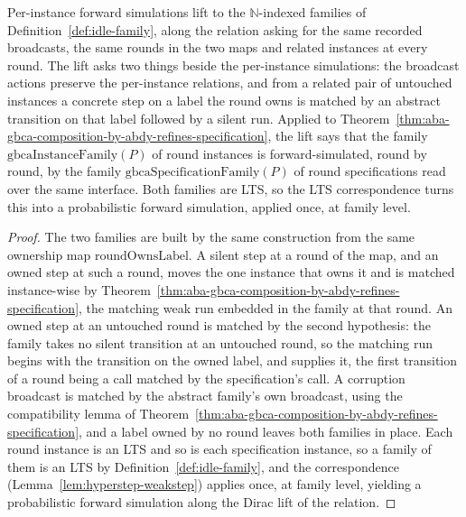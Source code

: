 \begin{theorem}
  \label{thm:gbca-family-refines}
  \leanok
  Per-instance forward simulations lift to the $\mathbb{N}$-indexed families of Definition~\ref{def:idle-family}, along the relation asking for the same recorded broadcasts, the same rounds in the two maps and related instances at every round.
  The lift asks two things beside the per-instance simulations: the broadcast actions preserve the per-instance relations, and from a related pair of untouched instances a concrete step on a label the round owns is matched by an abstract transition on that label followed by a silent run.
  Applied to Theorem~\ref{thm:aba-gbca-composition-by-abdy-refines-specification}, the lift says that the family $\mathrm{gbcaInstanceFamily}(P)$ of round instances is forward-simulated, round by round, by the family $\mathrm{gbcaSpecificationFamily}(P)$ of round specifications read over the same interface.
  Both families are LTS, so the LTS correspondence turns this into a probabilistic forward simulation, applied once, at family level.
\end{theorem}

\begin{proof}\leanok
  The two families are built by the same construction from the same ownership map $\mathrm{roundOwnsLabel}$.
  A silent step at a round of the map, and an owned step at such a round, moves the one instance that owns it and is matched instance-wise by Theorem~\ref{thm:aba-gbca-composition-by-abdy-refines-specification}, the matching weak run embedded in the family at that round.
  An owned step at an untouched round is matched by the second hypothesis: the family takes no silent transition at an untouched round, so the matching run begins with the transition on the owned label, and  supplies it, the first transition of a round being a call matched by the specification's call.
  A corruption broadcast is matched by the abstract family's own broadcast, using the compatibility lemma of Theorem~\ref{thm:aba-gbca-composition-by-abdy-refines-specification}, and a label owned by no round leaves both families in place.
  Each round instance is an LTS and so is each specification instance, so a family of them is an LTS by Definition~\ref{def:idle-family}, and the correspondence (Lemma~\ref{lem:hyperstep-weakstep}) applies once, at family level, yielding a probabilistic forward simulation along the Dirac lift of the relation.
\end{proof}
